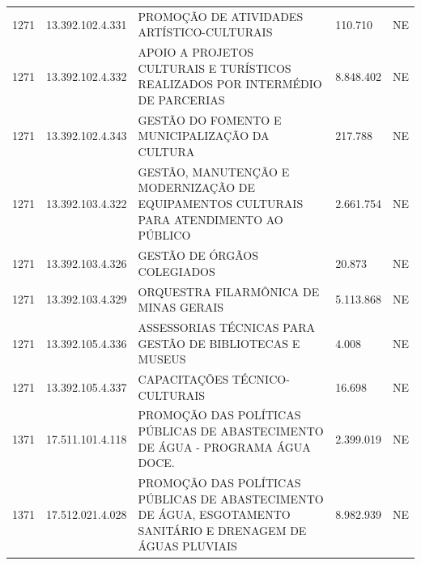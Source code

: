 \documentclass{article}
\begin{document}
\begin{longtable}[c]{m{1cm}|m{2cm}|m{10cm}|m{2cm}|m{1cm}}
\multicolumn{1}{C{1cm}|}{1271} & \multicolumn{1}{C{2cm}|}{13.392.102.4.331} & \multicolumn{1}{L{10cm}|}{PROMOÇÃO DE ATIVIDADES ARTÍSTICO-CULTURAIS} & \multicolumn{1}{R{2cm}|}{110.710} & \multicolumn{1}{C{1cm}}{NE} \\
\multicolumn{1}{C{1cm}|}{1271} & \multicolumn{1}{C{2cm}|}{13.392.102.4.332} & \multicolumn{1}{L{10cm}|}{APOIO A PROJETOS CULTURAIS E TURÍSTICOS REALIZADOS POR INTERMÉDIO DE PARCERIAS} & \multicolumn{1}{R{2cm}|}{8.848.402} & \multicolumn{1}{C{1cm}}{NE} \\
\multicolumn{1}{C{1cm}|}{1271} & \multicolumn{1}{C{2cm}|}{13.392.102.4.343} & \multicolumn{1}{L{10cm}|}{GESTÃO DO FOMENTO E MUNICIPALIZAÇÃO DA CULTURA} & \multicolumn{1}{R{2cm}|}{217.788} & \multicolumn{1}{C{1cm}}{NE} \\
\multicolumn{1}{C{1cm}|}{1271} & \multicolumn{1}{C{2cm}|}{13.392.103.4.322} & \multicolumn{1}{L{10cm}|}{GESTÃO, MANUTENÇÃO E MODERNIZAÇÃO DE EQUIPAMENTOS CULTURAIS PARA ATENDIMENTO AO PÚBLICO} & \multicolumn{1}{R{2cm}|}{2.661.754} & \multicolumn{1}{C{1cm}}{NE} \\
\multicolumn{1}{C{1cm}|}{1271} & \multicolumn{1}{C{2cm}|}{13.392.103.4.326} & \multicolumn{1}{L{10cm}|}{GESTÃO DE ÓRGÃOS COLEGIADOS} & \multicolumn{1}{R{2cm}|}{20.873} & \multicolumn{1}{C{1cm}}{NE} \\
\multicolumn{1}{C{1cm}|}{1271} & \multicolumn{1}{C{2cm}|}{13.392.103.4.329} & \multicolumn{1}{L{10cm}|}{ORQUESTRA FILARMÔNICA DE MINAS GERAIS} & \multicolumn{1}{R{2cm}|}{5.113.868} & \multicolumn{1}{C{1cm}}{NE} \\
\multicolumn{1}{C{1cm}|}{1271} & \multicolumn{1}{C{2cm}|}{13.392.105.4.336} & \multicolumn{1}{L{10cm}|}{ASSESSORIAS TÉCNICAS PARA GESTÃO DE BIBLIOTECAS E MUSEUS} & \multicolumn{1}{R{2cm}|}{4.008} & \multicolumn{1}{C{1cm}}{NE} \\
\multicolumn{1}{C{1cm}|}{1271} & \multicolumn{1}{C{2cm}|}{13.392.105.4.337} & \multicolumn{1}{L{10cm}|}{CAPACITAÇÕES TÉCNICO-CULTURAIS} & \multicolumn{1}{R{2cm}|}{16.698} & \multicolumn{1}{C{1cm}}{NE} \\
\multicolumn{1}{C{1cm}|}{1371} & \multicolumn{1}{C{2cm}|}{17.511.101.4.118} & \multicolumn{1}{L{10cm}|}{PROMOÇÃO DAS POLÍTICAS PÚBLICAS DE ABASTECIMENTO DE ÁGUA - PROGRAMA ÁGUA DOCE.} & \multicolumn{1}{R{2cm}|}{2.399.019} & \multicolumn{1}{C{1cm}}{NE} \\
\multicolumn{1}{C{1cm}|}{1371} & \multicolumn{1}{C{2cm}|}{17.512.021.4.028} & \multicolumn{1}{L{10cm}|}{PROMOÇÃO DAS POLÍTICAS PÚBLICAS DE ABASTECIMENTO DE ÁGUA, ESGOTAMENTO SANITÁRIO E DRENAGEM DE ÁGUAS PLUVIAIS} & \multicolumn{1}{R{2cm}|}{8.982.939} & \multicolumn{1}{C{1cm}}{NE} \\

\end{longtable}
\end{document}
